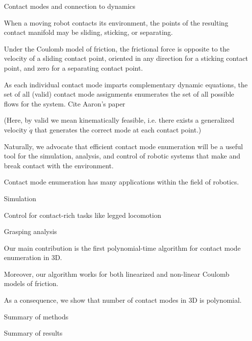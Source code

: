 \documentclass[conference]{IEEEtran}
\newcommand{\TODO}[1]{{\color{red} {{#1}}  }}
\begin{document}
\begin{inparaenum}
    \item Contact modes and connection to dynamics
    \begin{inparaenum}
        \item When a moving robot contacts its environment, the points of the
        resulting contact manifold may be sliding, sticking, or separating.
        \item Under the Coulomb model of friction, the frictional force is
        opposite to the velocity of a sliding contact point, oriented in any
        direction for a sticking contact point, and zero for a separating
        contact point.
        \item As each individual contact mode imparts complementary dynamic
        equations, the set of all (valid) contact mode assignments enumerates
        the set of all possible flows for the system. \TODO{Cite Aaron's paper}
        \item (Here, by valid we mean kinematically feasible, i.e. there exists a
        generalized velocity $\dot{q}$ that generates the correct mode at
        each contact point.)
        \item Naturally, we advocate that efficient contact mode enumeration
        will be a useful tool for the simulation, analysis, and control of
        robotic systems that make and break contact with the environment.
    \end{inparaenum}
    \item Contact mode enumeration has many applications within the field of
    robotics.
    \begin{inparaenum}
        \item 
        \item Simulation
        \item Control for contact-rich tasks like legged locomotion
        \item Grasping analysis
    \end{inparaenum}
    \item Our main contribution is the first polynomial-time algorithm for
    contact mode enumeration in 3D.
    \begin{inparaenum}
        \item Moreover, our algorithm works for both linearized and non-linear
        Coulomb models of friction.
        \item As a consequence, we show that number of contact modes in 3D is
        polynomial.
    \end{inparaenum}
    \item Summary of methods
    \item Summary of results
\end{inparaenum}
\end{document}
